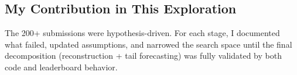 \subsection{My Contribution in This Exploration}
The 200+ submissions were hypothesis-driven. For each stage, I documented what failed, updated assumptions, and narrowed the search space until the final decomposition (reconstruction + tail forecasting) was fully validated by both code and leaderboard behavior.

\FloatBarrier
